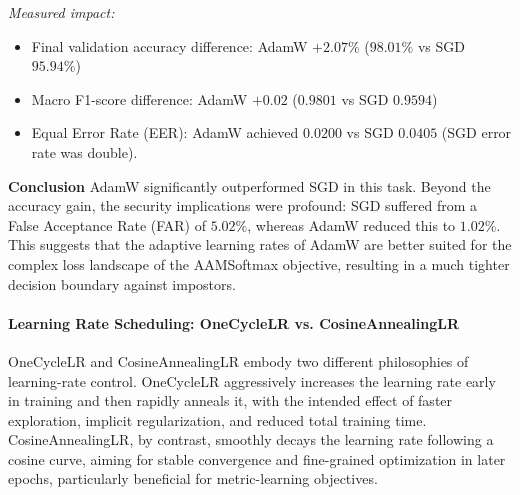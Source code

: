 \documentclass[12pt,a4paper]{article}
\begin{document}
\textit{Measured impact:}
\begin{itemize}
    \item Final validation accuracy difference: AdamW $+2.07\%$ ($98.01\%$ vs SGD $95.94\%$)
    \item Macro F1-score difference: AdamW $+0.02$ ($0.9801$ vs SGD $0.9594$)
    \item Equal Error Rate (EER): AdamW achieved $0.0200$ vs SGD $0.0405$ (SGD error rate was double).
\end{itemize}
\textbf{Conclusion}
AdamW significantly outperformed SGD in this task. Beyond the accuracy gain, the security implications were profound: SGD suffered from a False Acceptance Rate (FAR) of $5.02\%$, whereas AdamW reduced this to $1.02\%$. This suggests that the adaptive learning rates of AdamW are better suited for the complex loss landscape of the AAMSoftmax objective, resulting in a much tighter decision boundary against impostors.


\paragraph{Learning Rate Scheduling: OneCycleLR vs. CosineAnnealingLR}
OneCycleLR and CosineAnnealingLR embody two different philosophies of learning-rate control. OneCycleLR aggressively increases the learning rate early in training and then rapidly anneals it, with the intended effect of faster exploration, implicit regularization, and reduced total training time. CosineAnnealingLR, by contrast, smoothly decays the learning rate following a cosine curve, aiming for stable convergence and fine-grained optimization in later epochs, particularly beneficial for metric-learning objectives.
\end{document}
